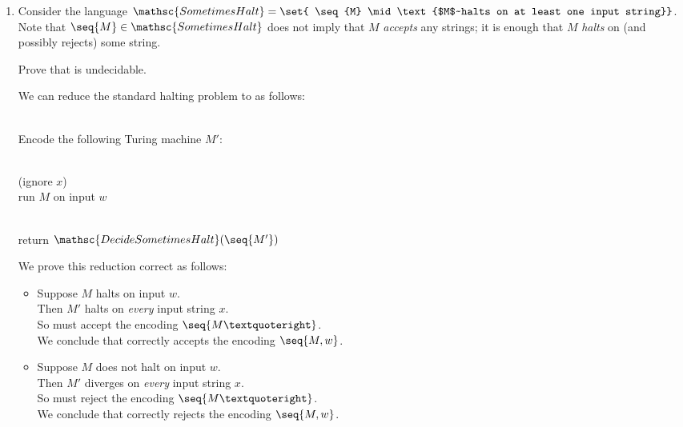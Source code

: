 \documentclass[11pt]{article}
\begin{document}
\begin{enumerate}\parindent 1.5em

\item
Consider the language $\mathsc{SometimesHalt} = \set{ \seq{M} \mid \text{$M$~halts
on at least one input string}}$.  Note that $\seq{M}\in \mathsc{SometimesHalt}$ does not imply that $M$ \emph{accepts} any strings; it is enough that $M$ \emph{halts} on (and possibly rejects) some string.

Prove that  is undecidable.

\begin{Solution}
We can reduce the standard halting problem to  as follows:
\begin{algo}
	\+
\\	Encode the following Turing machine $M'$:\+
\\	\color{OliveGreen}
	\qquad \begin{algorithm}
		\+
	\\		(ignore $x$)
	\\		run $M$ on input $w$
	\end{algorithm}
\\[1ex]
	return $\mathsc{DecideSometimesHalt}(\seq{M'})$\-
\end{algo}
We prove this reduction correct as follows:

\begin{itemize}
\item[$\Longrightarrow$]
Suppose $M$ halts on input $w$.\\
Then $M'$ halts on \emph{every} input string $x$.\\
So  must accept the encoding $\seq{M’}$.\\
We conclude that  correctly accepts the encoding $\seq{M, w}$.

\item[$\Longleftarrow$]
Suppose $M$ does not halt on input $w$.\\
Then $M'$ diverges on \emph{every} input string $x$.\\
So  must reject the encoding $\seq{M’}$.\\
We conclude that  correctly rejects the encoding $\seq{M, w}$.
\end{itemize} 
\end{Solution}

\end{enumerate}
\end{document}
